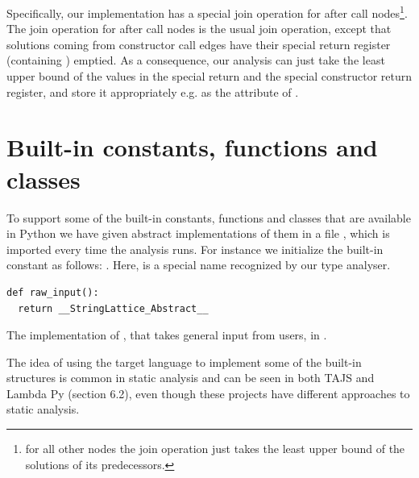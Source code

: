 Specifically, our implementation has a special join operation for after call nodes\footnote{for all other nodes the join operation just takes the least upper bound of the solutions of its predecessors.}. The join operation for after call nodes is the usual join operation, except that solutions coming from constructor call edges have their special return register (containing ) emptied. As a consequence, our analysis can just take the least upper bound of the values in the special return and the special constructor return register, and store it appropriately e.g. as the attribute  of .


\section{Built-in constants, functions and classes}
To support some of the built-in constants, functions and classes that are available in Python we have given abstract implementations of them in a file , which is imported every time the analysis runs. For instance we initialize the built-in constant  as follows: . Here,  is a special name recognized by our type analyser.

\begin{listing}[H]
	\begin{verbatim}
def raw_input():
  return __StringLattice_Abstract__
	\end{verbatim}
	\caption{The implementation of , that takes general input from users, in .}
\end{listing}

The idea of using the target language to implement some of the built-in structures is common in static analysis and can be seen in both TAJS \cite{tajs} and Lambda Py \cite{lambdapy} (section 6.2), even though these projects have different approaches to static analysis.




